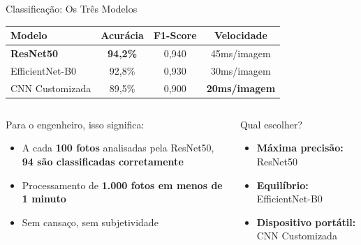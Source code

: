 \documentclass[aspectratio=169, 12pt]{beamer}
\begin{document}
\begin{frame}{Classificação: Os Três Modelos}
    \begin{table}
        \centering
        \small
        \begin{tabular}{l c c c}
            \toprule
            \textbf{Modelo} & \textbf{Acurácia} & \textbf{F1-Score} & \textbf{Velocidade} \\
            \midrule
            \textbf{ResNet50} & \textcolor{verdepositivo}{\textbf{94,2\%}} & 0,940 & 45ms/imagem \\
            EfficientNet-B0 & 92,8\% & 0,930 & 30ms/imagem \\
            CNN Customizada & 89,5\% & 0,900 & \textcolor{verdepositivo}{\textbf{20ms/imagem}} \\
            \bottomrule
        \end{tabular}
    \end{table}

    \vspace{0.3cm}

    \begin{columns}[T]
        \begin{block}{Para o engenheiro, isso significa:}
            \begin{itemize}
                \item A cada \textbf{100 fotos} analisadas pela ResNet50, \textbf{94 são classificadas corretamente}
                \item Processamento de \textbf{1.000 fotos em menos de 1 minuto}
                \item Sem cansaço, sem subjetividade
            \end{itemize}
        \end{block}

        \begin{block}{Qual escolher?}
            \begin{itemize}
                \item[\faAward] \textbf{Máxima precisão:} ResNet50
                \item[\faBalanceScale] \textbf{Equilíbrio:} EfficientNet-B0
                \item[\faMobileAlt] \textbf{Dispositivo portátil:} CNN Customizada
            \end{itemize}
        \end{block}
    \end{columns}
\end{frame}
\end{document}
